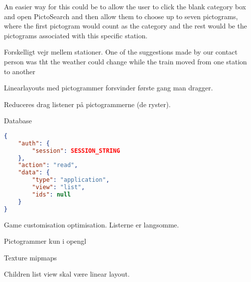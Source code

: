 \begin{description}
An easier way for this could be to allow the user to click the blank category box and open PictoSearch and then allow them to choose up to seven pictograms, where the first pictogram would count as the category and the rest would be the pictograms associated with this specific station.
\item Forskelligt vejr mellem stationer. One of the suggestions made by our contact person was tht the weather could change while the train moved from one station to another
\item Linearlayouts med pictogrammer forsvinder første gang man dragger.
\item Reduceres drag listener på pictogrammerne (de ryster).
\item Database  
\begin{lstlisting}[language=json,firstnumber=1,caption={JSON guery to read application data},label=lst:jsonread]
{
	"auth": {
		"session": SESSION_STRING
	},
	"action": "read",
	"data": {
		"type": "application",
		"view": "list",
		"ids": null
	}
}
\end{lstlisting} 

\item Game customisation optimisation. Listerne er langsomme.
\item Pictogrammer kun i opengl
\item Texture mipmaps
\item Children list view skal være linear layout.


\end{description}
